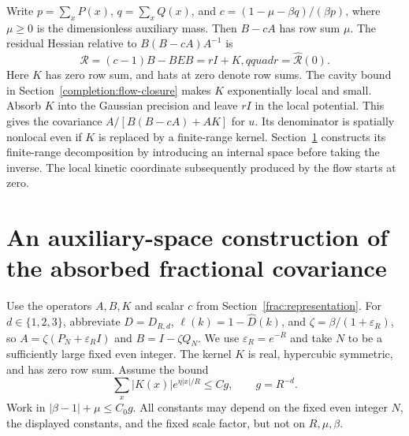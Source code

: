 \documentclass[11pt]{article}
\begin{document}
Write \(p=\sum_xP(x)\), \(q=\sum_xQ(x)\), and
\(c=(1-\mu-\beta q)/(\beta p)\), where \(\mu\ge0\) is the
dimensionless auxiliary mass. Then \(B-cA\) has row sum \(\mu\).
The residual Hessian relative to \(B(B-cA)A^{-1}\) is
\[
 \mathscr R=(c-1)B-BEB=rI+K,qquad
 r=\widehat{\mathscr R}(0).
\]
Here \(K\) has zero row sum, and hats at zero denote row sums.
The cavity bound in Section~\ref{completion:flow-closure} makes
\(K\) exponentially local and small. Absorb \(K\) into the Gaussian
precision and leave \(rI\) in the local potential. This gives the
covariance \(A/[B(B-cA)+AK]\) for \(u\). Its denominator is
spatially nonlocal even if \(K\) is replaced by a finite-range
kernel. Section~\ref{complete:covariance} constructs its finite-range
decomposition by introducing an internal space before taking the
inverse. The local kinetic coordinate subsequently produced by the
flow starts at zero.

\section{An auxiliary-space construction of the absorbed fractional covariance}
\label{complete:covariance}
Use the operators \(A,B,K\) and scalar \(c\) from
Section~\ref{frac:representation}. For \(d\in\{1,2,3\}\), abbreviate
\(D=D_{R,d}\), \(\ell(k)=1-\widehat D(k)\), and
\(\zeta=\beta/(1+\varepsilon_R)\), so
\(A=\zeta(P_N+\varepsilon_R I)\) and \(B=I-\zeta Q_N\).
We use \(\varepsilon_R=e^{-R}\) and take \(N\) to be a sufficiently
large fixed even integer. The kernel \(K\) is real, hypercubic symmetric,
and has zero row sum. Assume the bound
\begin{equation}\label{complete:K-assumption}
 \sum_x |K(x)|e^{\eta|x|/R}\le Cg,\qquad g=R^{-d}.
\end{equation}
Work in \(|\beta-1|+\mu\le C_0g\). All constants may depend
on the fixed even integer \(N\), the displayed constants, and the
fixed scale factor, but not on \(R,\mu,\beta\).
\end{document}
